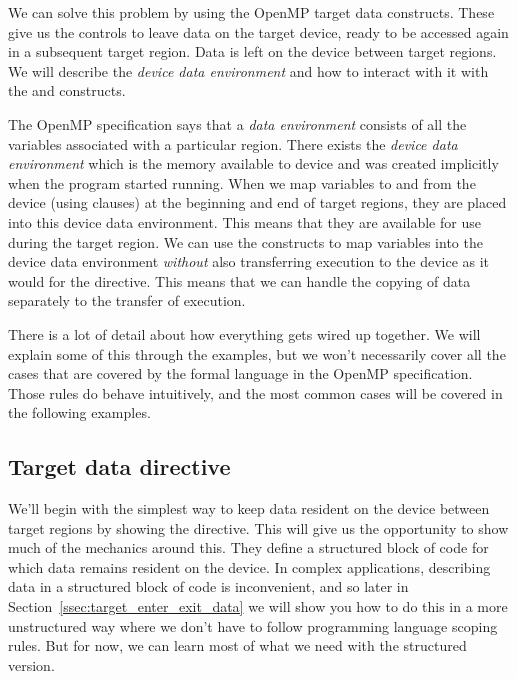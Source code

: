 We can solve this problem by using the OpenMP target data constructs.
These give us the controls to leave data on the target device, ready to be accessed again in a subsequent target region.
Data is left on the device between target regions.
We will describe the \emph{device data environment} and how to interact with it with the  and  constructs.

The OpenMP specification says that a \emph{data environment} consists of all the variables associated with a particular region.
There exists the \emph{device data environment} which is the memory available to device and was created implicitly when the program started running.
When we map variables to and from the device (using  clauses) at the beginning and end of target regions, they are placed into this device data environment.
This means that they are available for use during the target region.
We can use the  constructs to map variables into the device data environment \emph{without} also transferring execution to the device as it would for the  directive.
This means that we can handle the copying of data separately to the transfer of execution.

There is a lot of detail about how everything gets wired up together.
We will explain some of this through the examples, but we won't necessarily cover all the cases that are covered by the formal language in the OpenMP specification.
Those rules do behave intuitively, and the most common cases will be covered in the following examples.


\subsection{Target data directive}
\label{ssec:target_data}

We'll begin with the simplest way to keep data resident on the device between target regions by showing the  directive.
This will give us the opportunity to show much of the mechanics around this.
They define a structured block of code for which data remains resident on the device.
In complex applications, describing data in a structured block of code is inconvenient, and so later in Section~\ref{ssec:target_enter_exit_data} we will show you how to do this in a more unstructured way where we don't have to follow programming language scoping rules.
But for now, we can learn most of what we need with the structured version.

